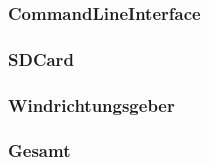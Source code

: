 \subsubsection{CommandLineInterface}
\label{subsubsec:valCommandLineInterface}

\subsubsection{SDCard}
\label{subsubsec:valSDCard}

\subsubsection{Windrichtungsgeber}
\label{subsubsec:valWindrichtungsgeber}

\subsubsection{Gesamt}
\label{subsubsec:valGesamt}